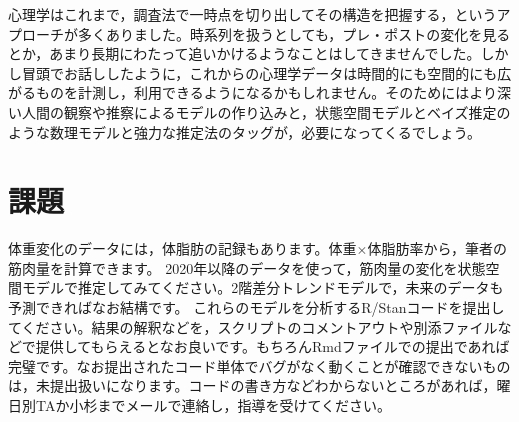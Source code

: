\documentclass{ltjsbook}
\begin{document}
心理学はこれまで，調査法で一時点を切り出してその構造を把握する，というアプローチが多くありました。時系列を扱うとしても，プレ・ポストの変化を見るとか，あまり長期にわたって追いかけるようなことはしてきませんでした。しかし冒頭でお話ししたように，これからの心理学データは時間的にも空間的にも広がるものを計測し，利用できるようになるかもしれません。そのためにはより深い人間の観察や推察によるモデルの作り込みと，状態空間モデルとベイズ推定のような数理モデルと強力な推定法のタッグが，必要になってくるでしょう。

\section{課題}
体重変化のデータには，体脂肪の記録もあります。体重$\times$体脂肪率から，筆者の筋肉量を計算できます。
2020年以降のデータを使って，筋肉量の変化を状態空間モデルで推定してみてください。2階差分トレンドモデルで，未来のデータも予測できればなお結構です。
これらのモデルを分析するR/Stanコードを提出してください。結果の解釈などを，スクリプトのコメントアウトや別添ファイルなどで提供してもらえるとなお良いです。もちろんRmdファイルでの提出であれば完璧です。なお提出されたコード単体でバグがなく動くことが確認できないものは，未提出扱いになります。コードの書き方などわからないところがあれば，曜日別TAか小杉までメールで連絡し，指導を受けてください。
\end{document}
